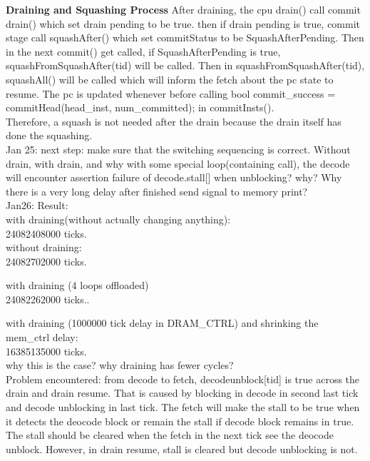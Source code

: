 \documentclass[11pt]{article}
\begin{document}
\textbf{Draining and Squashing Process}
After draining, the cpu drain() call commit drain() which set drain pending to be true. then if drain pending is true, commit stage call squashAfter() which set commitStatus to be SquashAfterPending. Then in the next commit() get called, if SquashAfterPending is true, squashFromSquashAfter(tid) will be called. Then in squashFromSquashAfter(tid), squashAll() will be called which will inform the fetch about the pc state to resume. The pc is updated whenever before calling bool commit\_success = commitHead(head\_inst, num\_committed); in commitInsts().\\

Therefore, a squash is not needed after the drain because the drain itself has done the squashing.\\

Jan 25: next step: make sure that the switching sequencing is correct. Without drain, with drain, and why with some special loop(containing call), the decode will encounter assertion failure of decode.stall[] when unblocking? why? Why there is a very long delay after finished send signal to memory print?\\

Jan26: Result: \\

with draining(without actually changing anything):  \\24082408000 ticks.\\

without draining: \\24082702000 ticks.

with draining (4 loops offloaded) \\
24082262000 ticks..

with draining (1000000 tick delay in DRAM\_CTRL) and shrinking the mem\_ctrl delay:\\
16385135000 ticks.\\

why this is the case? why draining has fewer cycles?\\

Problem encountered: from decode to fetch, decodeunblock[tid] is true across the drain and drain resume. That is caused by blocking in decode in second last tick and decode unblocking in last tick. The fetch will make the stall to be true when it detects the deocode block or remain the stall if decode block remains in true. The stall should be cleared when the fetch in the next tick see the deocode unblock. However, in drain resume, stall is cleared but decode unblocking is not. \\
\end{document}
